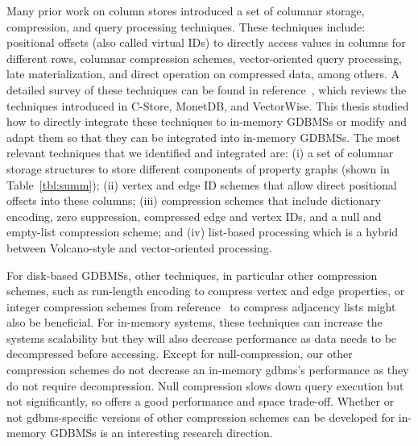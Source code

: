 Many prior work on column stores introduced a set of columnar storage, compression, and query processing techniques. These techniques include: positional offsets (also called virtual IDs) to directly access values in columns for different rows, columnar compression schemes, vector-oriented query processing, late materialization, and direct operation on compressed data, among others. A detailed survey of these techniques can be found in reference~\cite{design-imp-book}, which reviews the techniques introduced in C-Store, MonetDB, and VectorWise.  This thesis studied how to directly integrate these techniques to in-memory GDBMSs or modify and adapt them so that they can be integrated into in-memory GDBMSs. The most relevant techniques that we identified and integrated are:  (i) a set of columnar storage structures to store different components of property graphs (shown in Table~\ref{tbl:summ}); (ii) vertex and edge ID schemes that allow direct positional offsets into these columns; (iii) compression schemes that include dictionary encoding, zero suppression, compressed edge and vertex IDs, and a null and empty-list compression scheme;  and (iv) list-based processing which is a hybrid between Volcano-style and vector-oriented processing. 

For disk-based GDBMSs, other techniques, in particular other compression schemes, such as run-length encoding to compress vertex and edge properties, or integer compression schemes from reference~\cite{lemire:integer} to compress adjacency lists might also be beneficial. For in-memory systems, these techniques can increase the systems scalability but they will also decrease performance as data needs to be decompressed before accessing. Except for null-compression, our other compression schemes do not decrease an in-memory \gls{gdbms}'s performance as they do not require decompression. Null compression slows down query execution but not significantly, so offers a good performance and space trade-off. Whether or not \gls{gdbms}-specific versions of other compression schemes can be developed for in-memory GDBMSs is an interesting research direction.


